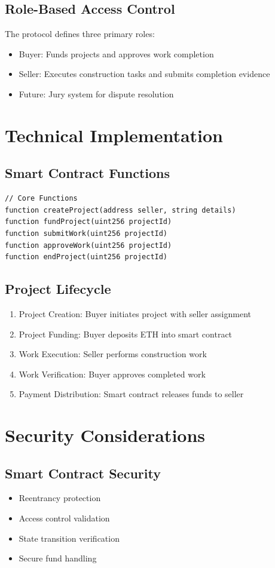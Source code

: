 \documentclass[12pt]{article}
\begin{document}
\subsection{Role-Based Access Control}
The protocol defines three primary roles:
\begin{itemize}
    \item Buyer: Funds projects and approves work completion
    \item Seller: Executes construction tasks and submits completion evidence
    \item Future: Jury system for dispute resolution
\end{itemize}

\section{Technical Implementation}
\subsection{Smart Contract Functions}
\begin{lstlisting}[language=Solidity]
// Core Functions
function createProject(address seller, string details)
function fundProject(uint256 projectId)
function submitWork(uint256 projectId)
function approveWork(uint256 projectId)
function endProject(uint256 projectId)
\end{lstlisting}

\subsection{Project Lifecycle}
\begin{enumerate}
    \item Project Creation: Buyer initiates project with seller assignment
    \item Project Funding: Buyer deposits ETH into smart contract
    \item Work Execution: Seller performs construction work
    \item Work Verification: Buyer approves completed work
    \item Payment Distribution: Smart contract releases funds to seller
\end{enumerate}

\section{Security Considerations}
\subsection{Smart Contract Security}
\begin{itemize}
    \item Reentrancy protection
    \item Access control validation
    \item State transition verification
    \item Secure fund handling
\end{itemize}
\end{document}
